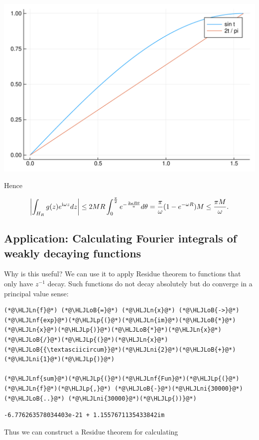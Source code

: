 \documentclass[12pt,a4paper]{article}
\newcommand{\HLJLn}[1]{#1}
\newcommand{\HLJLnf}[1]{\textcolor[RGB]{66,102,213}{#1}}
\newcommand{\HLJLni}[1]{\textcolor[RGB]{59,151,46}{#1}}
\newcommand{\HLJLoB}[1]{\textcolor[RGB]{102,102,102}{\textbf{#1}}}
\newcommand{\HLJLp}[1]{#1}
\def\I{ {\rm i} }
\begin{document}
\includegraphics[width=\linewidth]{figures/Lecture5_13_1.pdf}

Hence 

\[
\left| \int_{H_R} g(z) e^{\I \omega z} dz \right|  \leq  2MR \int_0^{\pi\over 2} e^{- {2\omega R\theta \over \pi} } d\theta = {\pi \over \omega} (1 - e^{-\omega R}) M \leq {\pi M \over \omega}.
\]
\subsection{Application: Calculating Fourier integrals of weakly decaying functions}
Why is this useful? We can use it to apply Residue theorem to  functions that only have $z^{-1}$ decay. Such functions do not decay absolutely but do  converge in a principal value sense: 


\begin{lstlisting}
(*@\HLJLn{f}@*) (*@\HLJLoB{=}@*) (*@\HLJLn{x}@*) (*@\HLJLoB{->}@*) (*@\HLJLnf{exp}@*)(*@\HLJLp{(}@*)(*@\HLJLn{im}@*)(*@\HLJLoB{*}@*)(*@\HLJLn{x}@*)(*@\HLJLp{)}@*)(*@\HLJLoB{*}@*)(*@\HLJLn{x}@*)(*@\HLJLoB{/}@*)(*@\HLJLp{(}@*)(*@\HLJLn{x}@*)(*@\HLJLoB{{\textasciicircum}}@*)(*@\HLJLni{2}@*)(*@\HLJLoB{+}@*)(*@\HLJLni{1}@*)(*@\HLJLp{)}@*)

(*@\HLJLnf{sum}@*)(*@\HLJLp{(}@*)(*@\HLJLnf{Fun}@*)(*@\HLJLp{(}@*)(*@\HLJLn{f}@*)(*@\HLJLp{,}@*) (*@\HLJLoB{-}@*)(*@\HLJLni{30000}@*) (*@\HLJLoB{..}@*) (*@\HLJLni{30000}@*)(*@\HLJLp{))}@*)
\end{lstlisting}

\begin{lstlisting}
-6.776263578034403e-21 + 1.1557671135433842im
\end{lstlisting}


Thus we can construct a Residue theorem for calculating 
\end{document}
